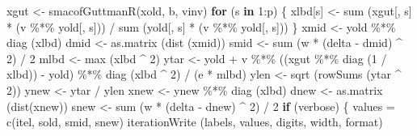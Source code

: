 \documentclass[
  12pt,
  letterpaper,
  DIV=11,
  numbers=noendperiod]{scrreprt}
\newenvironment{Shaded}{\begin{snugshade}}{\end{snugshade}}
\newcommand{\ControlFlowTok}[1]{\textcolor[rgb]{0.00,0.23,0.31}{\textbf{#1}}}
\newcommand{\DecValTok}[1]{\textcolor[rgb]{0.68,0.00,0.00}{#1}}
\newcommand{\FunctionTok}[1]{\textcolor[rgb]{0.28,0.35,0.67}{#1}}
\newcommand{\NormalTok}[1]{\textcolor[rgb]{0.00,0.23,0.31}{#1}}
\newcommand{\OtherTok}[1]{\textcolor[rgb]{0.00,0.23,0.31}{#1}}
\newcommand{\SpecialCharTok}[1]{\textcolor[rgb]{0.37,0.37,0.37}{#1}}
\theoremstyle{remark}
\begin{document}
\begin{Shaded}
\begin{Highlighting}[]
\NormalTok{      xgut }\OtherTok{\textless{}{-}} \FunctionTok{smacofGuttmanR}\NormalTok{(xold, b, vinv)}
      \ControlFlowTok{for}\NormalTok{ (s }\ControlFlowTok{in} \DecValTok{1}\SpecialCharTok{:}\NormalTok{p) \{}
\NormalTok{        xlbd[s] }\OtherTok{\textless{}{-}}
          \FunctionTok{sum}\NormalTok{ (xgut[, s] }\SpecialCharTok{*}\NormalTok{ (v }\SpecialCharTok{\%*\%}\NormalTok{ yold[, s])) }\SpecialCharTok{/} \FunctionTok{sum}\NormalTok{ (yold[, s] }\SpecialCharTok{*}\NormalTok{ (v }\SpecialCharTok{\%*\%}\NormalTok{ yold[, s]))}
\NormalTok{      \}}
\NormalTok{      xmid }\OtherTok{\textless{}{-}}\NormalTok{ yold }\SpecialCharTok{\%*\%} \FunctionTok{diag}\NormalTok{ (xlbd)}
\NormalTok{      dmid }\OtherTok{\textless{}{-}} \FunctionTok{as.matrix}\NormalTok{ (}\FunctionTok{dist}\NormalTok{ (xmid))}
\NormalTok{      smid }\OtherTok{\textless{}{-}} \FunctionTok{sum}\NormalTok{ (w }\SpecialCharTok{*}\NormalTok{ (delta }\SpecialCharTok{{-}}\NormalTok{ dmid) }\SpecialCharTok{\^{}} \DecValTok{2}\NormalTok{) }\SpecialCharTok{/} \DecValTok{2}
\NormalTok{      mlbd }\OtherTok{\textless{}{-}} \FunctionTok{max}\NormalTok{ (xlbd }\SpecialCharTok{\^{}} \DecValTok{2}\NormalTok{)}
\NormalTok{      ytar }\OtherTok{\textless{}{-}}
\NormalTok{        yold }\SpecialCharTok{+}\NormalTok{ v }\SpecialCharTok{\%*\%}\NormalTok{ ((xgut }\SpecialCharTok{\%*\%} \FunctionTok{diag}\NormalTok{ (}\DecValTok{1} \SpecialCharTok{/}\NormalTok{ xlbd)) }\SpecialCharTok{{-}}\NormalTok{ yold) }\SpecialCharTok{\%*\%} \FunctionTok{diag}\NormalTok{ (xlbd }\SpecialCharTok{\^{}} \DecValTok{2}\NormalTok{) }\SpecialCharTok{/}\NormalTok{ (e }\SpecialCharTok{*}\NormalTok{ mlbd)}
\NormalTok{      ylen }\OtherTok{\textless{}{-}} \FunctionTok{sqrt}\NormalTok{ (}\FunctionTok{rowSums}\NormalTok{ (ytar }\SpecialCharTok{\^{}} \DecValTok{2}\NormalTok{))}
\NormalTok{      ynew }\OtherTok{\textless{}{-}}\NormalTok{ ytar }\SpecialCharTok{/}\NormalTok{ ylen}
\NormalTok{      xnew }\OtherTok{\textless{}{-}}\NormalTok{ ynew }\SpecialCharTok{\%*\%} \FunctionTok{diag}\NormalTok{ (xlbd)}
\NormalTok{      dnew }\OtherTok{\textless{}{-}} \FunctionTok{as.matrix}\NormalTok{ (}\FunctionTok{dist}\NormalTok{(xnew))}
\NormalTok{      snew }\OtherTok{\textless{}{-}} \FunctionTok{sum}\NormalTok{ (w }\SpecialCharTok{*}\NormalTok{ (delta }\SpecialCharTok{{-}}\NormalTok{ dnew) }\SpecialCharTok{\^{}} \DecValTok{2}\NormalTok{) }\SpecialCharTok{/} \DecValTok{2}
      \ControlFlowTok{if}\NormalTok{ (verbose) \{}
\NormalTok{        values }\OtherTok{=} \FunctionTok{c}\NormalTok{(itel, sold, smid, snew)}
        \FunctionTok{iterationWrite}\NormalTok{ (labels, values, digits, width, format)}

\end{Highlighting}
\end{Shaded}
\end{document}
